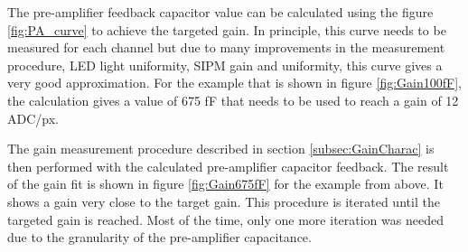 The pre-amplifier feedback capacitor value can be calculated using the figure \ref{fig:PA_curve} to achieve the targeted gain. In principle, this curve needs to be measured for each channel but due to many improvements in the measurement procedure, LED light uniformity, SIPM gain and uniformity, this curve gives a very good approximation. For the example that is shown in figure \ref{fig:Gain100fF}, the calculation gives a value of 675 fF that needs to be used to reach a gain of 12 ADC/px.

The gain measurement procedure described in section \ref{subsec:GainCharac} is then performed with the calculated pre-amplifier capacitor feedback. The result of the gain fit is shown in figure \ref{fig:Gain675fF} for the example from above. It shows a gain very close to the target gain. This procedure is iterated until the targeted gain is reached. Most of the time, only one more iteration was needed due to the granularity of the pre-amplifier capacitance.

